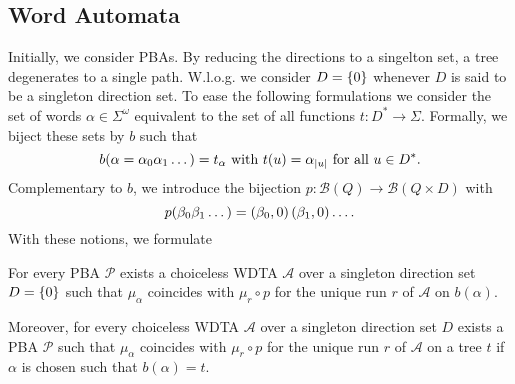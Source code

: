 \subsection{Word Automata}
Initially, we consider \acp{PBA}. By reducing the directions to a singelton
set, a tree degenerates to a single path. W.l.o.g. we consider $D = \left\{0\right\}$
whenever $D$ is said to be a singleton direction set. To ease the following
formulations we consider the set of words $\alpha\in\Sigma^{\omega}$
equivalent to the set of all functions $t:D^{*}\rightarrow\Sigma$. Formally, we
biject these sets by $b$ such that
\begin{equation*}
  b(\alpha = \alpha_{0}\alpha_{1}\dots) = t_{\alpha}\text{ with }
  t(u) = \alpha_{\left\vert{u}\right\vert} \text{ for all }u\in D^{*}.
\end{equation*}
Complementary to $b$, we introduce the bijection
$p:\mathcal{B}(Q)\rightarrow\mathcal{B}(Q\times D)$ with
\begin{equation*}
  p(\beta_{0}\beta_{1}\dots) = \left(\beta_{0}, 0\right)\left(\beta_{1}, 0\right)\dots.
\end{equation*}
With these notions, we formulate
\begin{lemma}
  For every \ac{PBA} $\mathcal{P}$ exists a choiceless \ac{WDTA} $\mathcal{A}$
  over a singleton direction set $D = \left\{0\right\}$ such that $\mu_{\alpha}$
  coincides with $\mu_{r}\circ p$ for the unique run $r$ of $\mathcal{A}$ on
  $b(\alpha)$.

  Moreover, for every choiceless \ac{WDTA} $\mathcal{A}$ over a singleton
  direction set $D$ exists a \ac{PBA} $\mathcal{P}$ such that $\mu_{\alpha}$
  coincides with $\mu_{r}\circ p$ for the unique run $r$ of $\mathcal{A}$ on a
  tree $t$ if $\alpha$ is chosen such that $b(\alpha) = t$.
  \label{lem:pbaaswdta}
\end{lemma}
